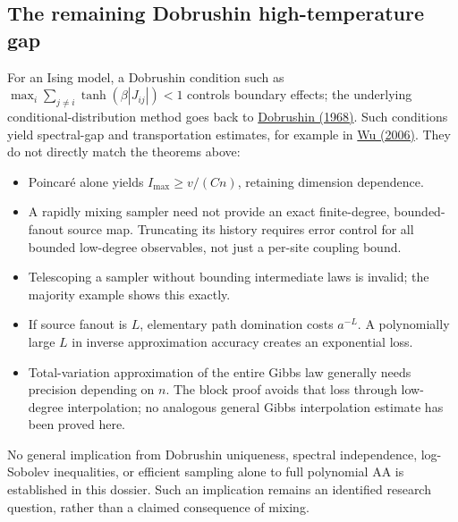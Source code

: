 \subsection{The remaining Dobrushin high-temperature
gap}\label{proof:positive_structure:the-remaining-dobrushin-high-temperature-gap}

For an Ising model, a Dobrushin condition such as
\(\max _i \sum_{j\ne i} \tanh (\beta  |J_{ij}|)<1\) controls boundary
effects; the underlying conditional-distribution method goes back to
\href{https://doi.org/10.1137/1113026}{Dobrushin (1968)}. Such
conditions yield spectral-gap and transportation estimates, for example
in \href{https://arxiv.org/abs/math/0611635}{Wu (2006)}. They do not
directly match the theorems above:

\begin{itemize}
\tightlist
\item
  Poincaré alone yields \(I_{\max}\ge v/(C n)\), retaining dimension
  dependence.
\item
  A rapidly mixing sampler need not provide an exact finite-degree,
  bounded-fanout source map. Truncating its history requires error
  control for all bounded low-degree observables, not just a per-site
  coupling bound.
\item
  Telescoping a sampler without bounding intermediate laws is invalid;
  the majority example shows this exactly.
\item
  If source fanout is \(L\), elementary path domination costs
  \(a^{-L}\). A polynomially large \(L\) in inverse approximation
  accuracy creates an exponential loss.
\item
  Total-variation approximation of the entire Gibbs law generally needs
  precision depending on \(n\). The block proof avoids that loss through
  low-degree interpolation; no analogous general Gibbs interpolation
  estimate has been proved here.
\end{itemize}

No general implication from Dobrushin uniqueness, spectral independence,
log-Sobolev inequalities, or efficient sampling alone to full polynomial
AA is established in this dossier. Such an implication remains an
identified research question, rather than a claimed consequence of
mixing.
